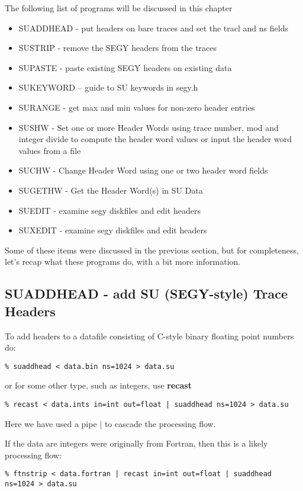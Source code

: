 {{{The following list of programs will be discussed in this chapter
\begin{itemize}
\item SUADDHEAD - put headers on bare traces and set the tracl and ns fields 
\item SUSTRIP - remove the SEGY headers from the traces 
\item SUPASTE - paste existing SEGY headers on existing data
\item SUKEYWORD -- guide to SU keywords in segy.h 
\item SURANGE - get max and min values for non-zero header entries
\item SUSHW - Set one or more Header Words using trace number, mod and
integer divide to compute the header word values or input the header word
values from a file 
\item SUCHW - Change Header Word using one or two header word fields 
\item SUGETHW - Get the Header Word(s) in SU Data
\item SUEDIT - examine segy diskfiles and edit headers 
\item SUXEDIT - examine segy diskfiles and edit headers 
\end{itemize}

Some of these items were discussed in the previous section, but 
for completeness, let's recap what these programs do,
with a bit more information.

\subsection{SUADDHEAD - add SU (SEGY-style) Trace Headers}

To add headers to a datafile consisting of C-style binary floating
point numbers do:
{\small\begin{verbatim}
% suaddhead < data.bin ns=1024 > data.su
\end{verbatim}}\noindent
or for some other type, such as integers, use {\bf recast\/}
{\small\begin{verbatim}
% recast < data.ints in=int out=float | suaddhead ns=1024 > data.su
\end{verbatim}}\noindent
Here we have used a pipe $|$ to cascade the processing flow.

If the data are integers were originally from Fortran, then this is a likely
processing flow:
{\small\begin{verbatim}
% ftnstrip < data.fortran | recast in=int out=float | suaddhead ns=1024 > data.su
\end{verbatim}}\noindent

}}}
